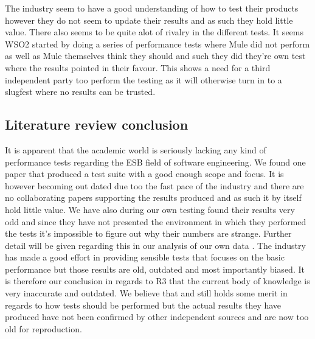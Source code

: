 The industry seem to have a good understanding of how to test their products however they do not seem to update their results and as such they hold little value.
There also seems to be quite alot of rivalry in the different tests. It seems WSO2 started by doing a series of performance tests where Mule did not perform as well as Mule themselves think they should and such they did they're own test where the results pointed in their favour.
This shows a need for a third independent party too perform the testing as it will otherwise turn in to a slugfest where no results can be trusted. 


\subsection{Literature review conclusion}

It is apparent that the academic world is seriously lacking any kind of performance tests regarding the ESB field of software engineering. 
We found one paper\cite{Sanjay2011} that produced a test suite with a good enough scope and focus. 
It is however becoming out dated due too the fast pace of the industry and there are no collaborating papers supporting the results produced and as such it by itself hold little value. We have also during our own testing found their results very odd and since they have not presented the environment in which they performed the tests it's impossible to figure out why their numbers are strange. Further detail will be given regarding this in our analysis of our own data \cite{vår test resultat analys}.
 The industry has made a good effort in providing sensible tests that focuses on the basic performance but those results are old, outdated and most importantly biased. 
It is therefore our conclusion in regards to R3 that the current body of knowledge is very inaccurate and outdated. We believe that \cite{Sanjay2011} and \cite{Perera07,Perera07R2,Perera07R3,mulesoft08}still holds some merit in regards to how tests should be performed but the actual results they have produced have not been confirmed by other independent sources and are now too old for reproduction.
